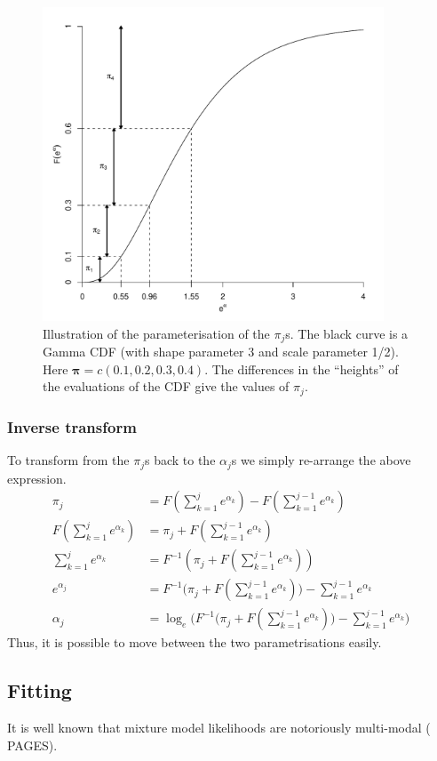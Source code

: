 \begin{figure}
\centering
\includegraphics[width=4in]{mix/figs/pidia.pdf}
\caption{Illustration of the parameterisation of the $\pi_j$s. The black curve is a Gamma CDF (with shape parameter 3 and scale parameter 1/2). Here $\bm{\pi}=c(0.1,0.2,0.3,0.4)$. The differences in the ``heights'' of the evaluations of the CDF give the values of $\pi_j$.}
\label{dlbpi}
\end{figure}

\subsubsection{Inverse transform}
To transform from the $\pi_j$s back to the $\alpha_j$s we simply re-arrange the above expression.
\begin{align*}
\pi_j &= F(\sum_{k=1}^j e^{\alpha_k}) - F(\sum_{k=1}^{j-1} e^{\alpha_k})\\
F(\sum_{k=1}^j e^{\alpha_k}) &= \pi_j + F(\sum_{k=1}^{j-1} e^{\alpha_k})\\
\sum_{k=1}^j e^{\alpha_k} &= F^{-1}(\pi_j + F(\sum_{k=1}^{j-1} e^{\alpha_k}))\\
e^{\alpha_j} &= F^{-1}\Big(\pi_j + F(\sum_{k=1}^{j-1} e^{\alpha_k})\Big) - \sum_{k=1}^{j-1} e^{\alpha_k}\\
\alpha_j &= \log_e \Big(F^{-1}\Big(\pi_j + F(\sum_{k=1}^{j-1} e^{\alpha_k})\Big) - \sum_{k=1}^{j-1} e^{\alpha_k}\Big)
\end{align*}
Thus, it is possible to move between the two parametrisations easily.

\subsection{Fitting}
It is well known that mixture model likelihoods are notoriously multi-modal (\cite{BDA} PAGES).

